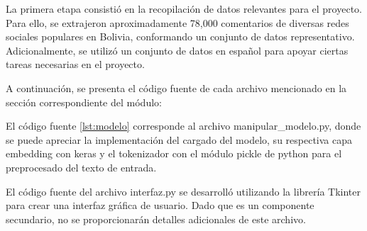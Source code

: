 La primera etapa consistió en la recopilación de datos relevantes para el proyecto. Para ello, se extrajeron aproximadamente 78,000 comentarios de diversas redes sociales populares en Bolivia, conformando un conjunto de datos representativo. Adicionalmente, se utilizó un conjunto de datos en español para apoyar ciertas tareas necesarias en el proyecto.

A continuación, se presenta el código fuente de cada archivo mencionado en la sección correspondiente del módulo:

El código fuente \ref{lst:modelo} corresponde al archivo manipular\_modelo.py, donde se puede apreciar la implementación del cargado del modelo, su respectiva capa embedding con keras y el tokenizador con el módulo pickle de python para el preprocesado del texto de entrada.




El código fuente del archivo interfaz.py se desarrolló utilizando la librería Tkinter para crear una interfaz gráfica de usuario. Dado que es un componente secundario, no se proporcionarán detalles adicionales de este archivo.